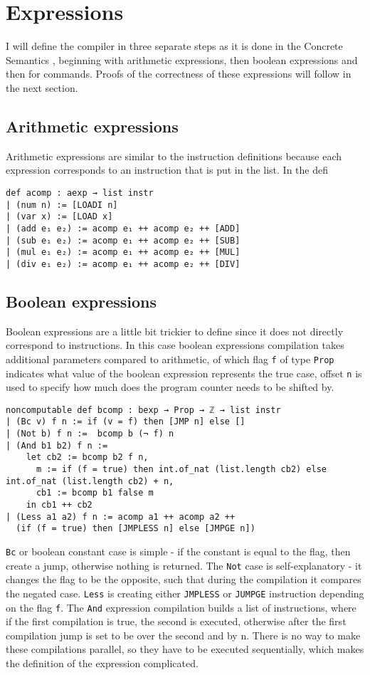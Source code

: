 \chapter{Expressions}\label{s:expressions}
I will define the compiler in three separate steps as it is done in the Concrete Semantics \cite{isabelle}, beginning with arithmetic expressions, then boolean expressions and then for commands. Proofs of the correctness of these expressions will follow in the next section.

\section{Arithmetic expressions}

Arithmetic expressions are similar to the instruction definitions because each expression corresponds to an instruction that is put in the list. In the defi
\begin{lstlisting}
def acomp : aexp → list instr
| (num n) := [LOADI n]
| (var x) := [LOAD x]
| (add e₁ e₂) := acomp e₁ ++ acomp e₂ ++ [ADD]
| (sub e₁ e₂) := acomp e₁ ++ acomp e₂ ++ [SUB]
| (mul e₁ e₂) := acomp e₁ ++ acomp e₂ ++ [MUL]
| (div e₁ e₂) := acomp e₁ ++ acomp e₂ ++ [DIV]
\end{lstlisting}

\section{Boolean expressions} \label{bexp}
Boolean expressions are a little bit trickier to define since it does not directly correspond to instructions. In this case boolean expressions compilation takes additional parameters compared to arithmetic, of which flag \lstinline{f} of type \lstinline{Prop} indicates what value of the boolean expression represents the true case, offset \lstinline{n} is used to specify how much does the program counter needs to be shifted by. 
\begin{lstlisting}
noncomputable def bcomp : bexp → Prop → ℤ → list instr 
| (Bc v) f n := if (v = f) then [JMP n] else []
| (Not b) f n :=  bcomp b (¬ f) n
| (And b1 b2) f n := 
    let cb2 := bcomp b2 f n,
      m := if (f = true) then int.of_nat (list.length cb2) else int.of_nat (list.length cb2) + n,
      cb1 := bcomp b1 false m
    in cb1 ++ cb2
| (Less a1 a2) f n := acomp a1 ++ acomp a2 ++ 
  (if (f = true) then [JMPLESS n] else [JMPGE n])
\end{lstlisting}

\lstinline{Bc} or boolean constant case is simple - if the constant is equal to the flag, then create a jump, otherwise nothing is returned. The \lstinline{Not} case is self-explanatory - it changes the flag to be the opposite, such that during the compilation it compares the negated case. \lstinline{Less} is creating either \lstinline{JMPLESS} or \lstinline{JUMPGE} instruction depending on the flag \lstinline{f}. The \lstinline{And} expression compilation builds a list of instructions, where if the first compilation is true, the second is executed, otherwise after the first compilation jump is set to be over the second and by n. There is no way to make these compilations parallel, so they have to be executed sequentially, which makes the definition of the expression complicated.  

